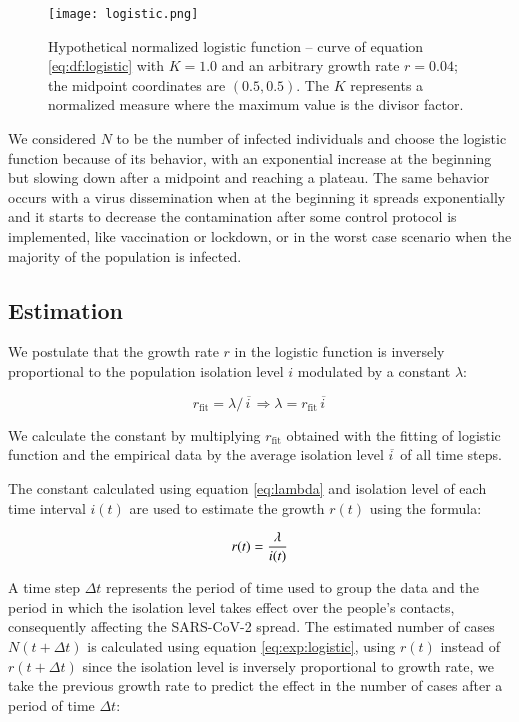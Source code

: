 \documentclass[review]{elsarticle}
\begin{document}
\begin{figure}
\texttt{[image: logistic.png]}
\caption{Hypothetical normalized logistic function -- 
curve of equation \ref{eq:df:logistic} with 
$K=1.0$ and an arbitrary growth rate $r=0.04$; 
the midpoint coordinates are $(0.5, 0.5)$.
The $K$ represents a normalized measure where 
the maximum value is the divisor factor.}
\label{fig:logistic}
\end{figure}

We considered $N$ to be the number of infected individuals 
and choose the logistic function because of its behavior, 
with an exponential increase at the beginning but slowing down after 
a  midpoint and reaching a plateau. 
The same behavior occurs with a virus dissemination when at the 
beginning it spreads exponentially and it starts to 
decrease the contamination after some control protocol is implemented, 
like vaccination or lockdown, 
or in the worst case scenario when the majority of the population is infected.

\subsection{Estimation}

We postulate that the growth rate $r$ in the logistic function is 
inversely proportional to the population isolation level $i$ 
modulated by a constant $\lambda$:

\begin{equation}
r_{\text{fit}} = {\lambda /\, \overline{i\,}} \Rightarrow \lambda = r_{\text{fit}}\, \overline{i\,}
\label{eq:lambda}
\end{equation}

We calculate the constant by multiplying $r_{\text{fit}}$ 
obtained with the fitting of 
logistic function and the empirical data by 
the average isolation level $\overline{i\,}$  
of all time steps.

The constant calculated using equation \ref{eq:lambda} 
and isolation level of each time interval $i(t)$ 
are used to estimate the growth $r(t)$ using the formula:

\begin{equation}
r(t) = {\lambda\over i(t)}
\label{eq:rt}
\end{equation}

A time step $\Delta t$ represents the period of time used to group the data 
and the period in which the isolation level takes effect over
 the people's contacts, consequently affecting the SARS-CoV-2 spread. 
The estimated number of cases $N(t+\Delta t)$ is calculated using
 equation \ref{eq:exp:logistic}, using $r(t)$ instead of $r(t+\Delta t)$ since 
the isolation level is inversely proportional to growth rate, we take
 the previous growth rate to predict the effect in the number of cases after a 
period of time $\Delta t$:
\end{document}
